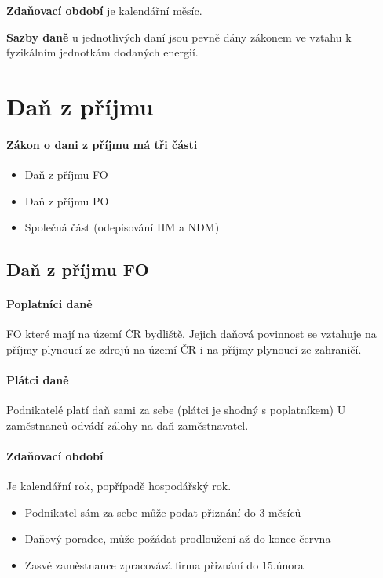 \textbf{Zdaňovací období} je kalendářní měsíc.

\textbf{Sazby daně} u jednotlivých daní jsou pevně dány zákonem ve vztahu k fyzikálním jednotkám dodaných energií.

\section*{Daň z příjmu}

\paragraph{Zákon o dani z příjmu má tři části}
\begin{itemize}
    \item Daň z příjmu FO
    \item Daň z příjmu PO
    \item Společná část (odepisování HM a NDM)
\end{itemize}

\subsection*{Daň z příjmu FO}

\paragraph{Poplatníci daně} FO které mají na území ČR bydliště. Jejich daňová povinnost se vztahuje na příjmy plynoucí ze zdrojů na území ČR i na příjmy plynoucí ze zahraničí.

\paragraph{Plátci daně} Podnikatelé platí daň sami za sebe (plátci je shodný s poplatníkem) U zaměstnanců odvádí zálohy na daň zaměstnavatel.

\paragraph{Zdaňovací období}
Je kalendářní rok, popřípadě hospodářský rok.

\begin{itemize}
    \item Podnikatel sám za sebe může podat přiznání do 3 měsíců
    \item Daňový poradce, může požádat prodloužení až do konce června
    \item Zasvé zaměstnance zpracovává firma přiznání do 15.února
\end{itemize}


